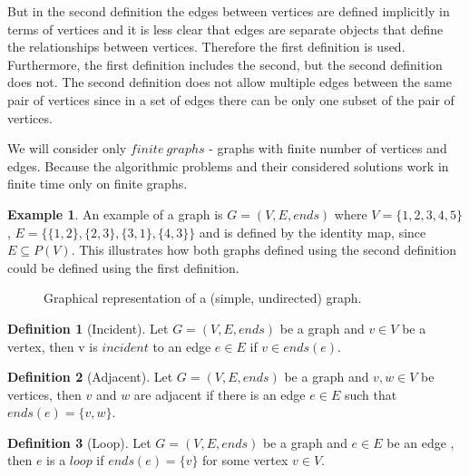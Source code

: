\documentclass{report}
\theoremstyle{plain}
\theoremstyle{definition}
\newtheorem{definition}{Definition}
\newtheorem{example}{Example}
\theoremstyle{remark}
\numberwithin{definition}{chapter}
\numberwithin{example}{chapter}
\numberwithin{figure}{chapter}
\numberwithin{theorem}{chapter}
\numberwithin{lemma}{chapter}
\begin{document}
But in the second definition the edges between vertices are defined implicitly in terms of vertices and it is less clear that edges are separate objects that define the relationships between vertices. Therefore the first definition is used. Furthermore, the first definition includes the second, but the second definition does not. The second definition does not allow multiple edges between the same pair of vertices since in a set of edges there can be only one subset of the pair of vertices.

We will consider only $finite \ graphs$ - graphs with finite number of vertices and edges. Because the algorithmic problems and their considered solutions work in finite time only on finite graphs.

\begin{example}
An example of a graph is $G=(V, E, ends)$ where $V=\{1,2,3,4,5\}$, $E=\{\{1,2\}, \{2,3\}, \{3,1\}, \{4,3\}\}$ and is defined by the identity map, since $E \subseteq P(V)$. This illustrates how both graphs defined using the second definition could be defined using the first definition.

\begin{figure}[h]
\center
{}
\caption{Graphical representation of a (simple, undirected) graph.}
\end{figure}
\end{example}

\begin{definition}[Incident]
Let $G = (V, E, ends)$ be a graph and $v\in V$ be a vertex, then v is $incident$ to an edge $e \in E$ if $v \in ends(e)$.
\end{definition}

\begin{definition}[Adjacent]
Let $G = (V, E, ends)$ be a graph and $v,w\in V$ be vertices, then $v$ and $w$ are adjacent if there is an edge $ e \in E$ such that $ends(e) = \{v, w\}$.
\end{definition}

\begin{definition}[Loop]
Let $G = (V, E, ends)$ be a graph and $e \in E$ be an edge , then $e$ is a $loop$ if $ends(e) = \{v\}$ for some vertex $v \in V$.
\end{definition}
\end{document}
